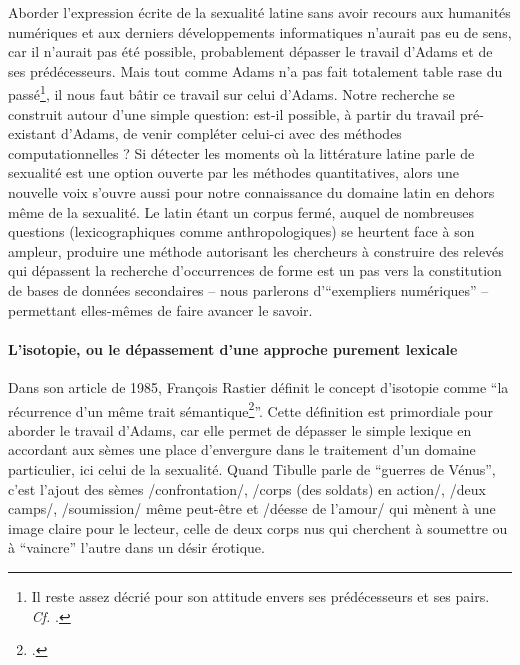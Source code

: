 Aborder l'expression écrite de la sexualité latine sans avoir recours aux humanités numériques et aux derniers développements informatiques n'aurait pas eu de sens, car il n'aurait pas été possible, probablement dépasser le travail d'Adams et de ses prédécesseurs. Mais tout comme Adams n'a pas fait totalement table rase du passé\footnote{Il reste assez décrié pour son attitude envers ses prédécesseurs et ses pairs. \textit{Cf.} \textcite{richlin_sexual_1978}.}, il nous faut bâtir ce travail sur celui d'Adams. Notre recherche se construit autour d'une simple question: est-il possible, à partir du travail pré-existant d'Adams, de venir compléter celui-ci avec des méthodes computationnelles ? Si détecter les moments où la littérature latine parle de sexualité est une option ouverte par les méthodes quantitatives, alors une nouvelle voix s'ouvre aussi pour notre connaissance du domaine latin en dehors même de la sexualité. Le latin étant un corpus fermé, auquel de nombreuses questions (lexicographiques comme anthropologiques) se heurtent face à son ampleur, produire une méthode autorisant les chercheurs à construire des relevés qui dépassent la recherche d'occurrences de forme est un pas vers la constitution de bases de données secondaires -- nous parlerons d'\enquote{exempliers numériques} -- permettant elles-mêmes de faire avancer le savoir.

\paragraph{L'isotopie, ou le dépassement d'une approche purement lexicale}

Dans son article de 1985, François Rastier définit le concept d'isotopie comme \enquote{la récurrence d'un même trait sémantique\footcite{rastier_isotopie_1985}}. Cette définition est primordiale pour aborder le travail d'Adams, car elle permet de dépasser le simple lexique en accordant aux sèmes une place d'envergure dans le traitement d'un domaine particulier, ici celui de la sexualité. Quand Tibulle parle de \enquote{guerres de Vénus}, c'est l'ajout des sèmes /confrontation/, /corps (des soldats) en action/, /deux camps/, /soumission/ même peut-être et /déesse de l'amour/ qui mènent à une image claire pour le lecteur, celle de deux corps nus qui cherchent à soumettre ou à \enquote{vaincre} l'autre dans un désir érotique.

